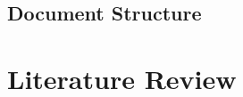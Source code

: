 \documentclass[12pt,a4paper,oneside]{article}
\begin{document}
%
%
%
%
%
%
%
%
%
%
%
%


\subsection{Document Structure}\label{subsec:structure}




\newpage
\section{Literature Review}\label{sec:literature}

%
\end{document}
